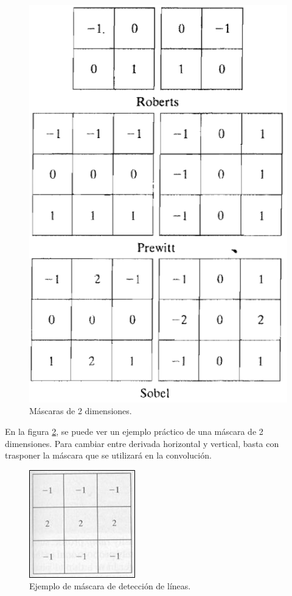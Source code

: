 \begin{figure}[H]
\begin{center}
\includegraphics[scale=0.5]{img/matriz2d.png}
\end{center}
\caption{Máscaras de 2 dimensiones.}
\label{matrix2d}
\end{figure}

En la figura \ref{gonz4}, se puede ver un ejemplo práctico de una máscara de 2 dimensiones. Para cambiar entre derivada horizontal y vertical, basta con trasponer la máscara que se utilizará en la convolución.

\begin{figure}[H]
\begin{center}
\includegraphics[scale=0.8]{img/07_matriz_deteccion_linea.jpg}
\end{center}
\caption{Ejemplo de máscara de detección de líneas.}
\label{gonz4}
\end{figure}

